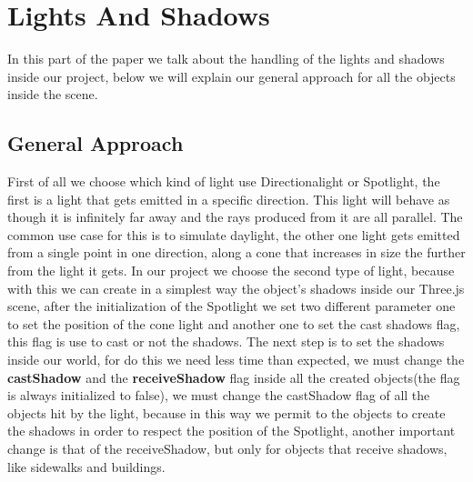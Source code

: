 \documentclass[a4paper, 11pt, titlepage]{report}
\begin{document}
\chapter{Lights And Shadows}
    In this part of the paper we talk about the handling of the lights and shadows inside our project, below we will explain our general approach for all the objects inside the scene. 
 
 \section{General Approach}
    First of all we choose which kind of light use Directionalight or Spotlight, the first is a light that gets emitted in a specific direction. This light will behave as though it is infinitely far away and the rays produced from it are all parallel. The common use case for this is to simulate daylight, the other one light gets emitted from a single point in one direction, along a cone that increases in size the further from the light it gets. In our project we choose the second type of light, because with this we can create in a simplest way the object's shadows inside our Three.js scene, after the initialization of the Spotlight we set two different parameter one to set the position of the cone light and another one to set the cast shadows flag, this flag is use to cast or not the shadows. The next step is to set the shadows inside our world, for do this we need less time than expected, we must change the \textbf{castShadow} and the \textbf{receiveShadow} flag inside all the created objects(the flag is always initialized to false), we must change the castShadow flag of all the objects hit by the light, because in this way we permit to the objects to create the shadows in order to respect the position of the Spotlight, another important change is that of the receiveShadow, but only for objects that receive shadows, like sidewalks and buildings.

\end{document}
